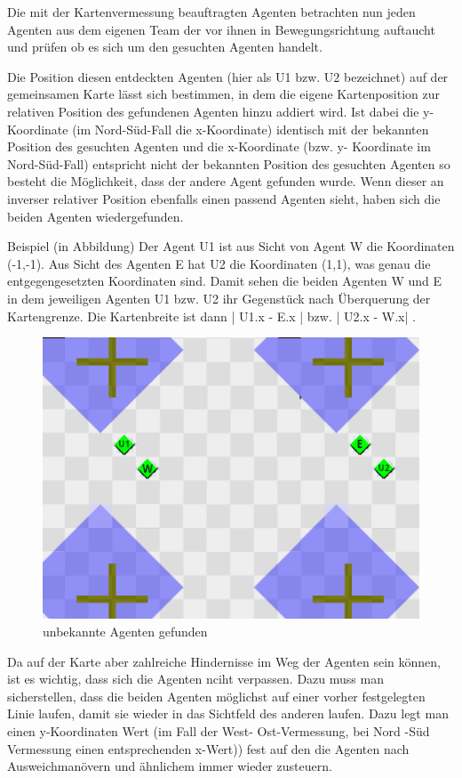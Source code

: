 \documentclass[runningheads]{llncs}
\begin{document}
Die mit der Kartenvermessung beauftragten Agenten betrachten nun jeden Agenten aus dem eigenen Team der vor ihnen in Bewegungsrichtung auftaucht und prüfen ob es sich um den gesuchten Agenten handelt.

Die Position diesen entdeckten Agenten (hier als U1 bzw. U2 bezeichnet) auf der gemeinsamen Karte lässt sich bestimmen, in dem die eigene Kartenposition zur relativen Position des gefundenen Agenten hinzu addiert wird. Ist dabei die y-Koordinate (im Nord-Süd-Fall die x-Koordinate) identisch mit der bekannten Position des gesuchten Agenten und die x-Koordinate (bzw. y- Koordinate im Nord-Süd-Fall) entspricht nicht der bekannten Position des gesuchten Agenten so besteht die Möglichkeit, dass der andere Agent gefunden wurde. Wenn dieser an inverser relativer Position ebenfalls einen passend Agenten sieht, haben sich die beiden Agenten wiedergefunden.

Beispiel (in Abbildung) 
Der Agent U1 ist aus Sicht von Agent W die Koordinaten (-1,-1). Aus Sicht des Agenten E hat U2 die Koordinaten (1,1), was genau die entgegengesetzten Koordinaten sind. Damit sehen die beiden Agenten W und E in dem jeweiligen Agenten U1 bzw. U2 ihr Gegenstück nach Überquerung der Kartengrenze. Die Kartenbreite ist dann | U1.x - E.x | bzw. | U2.x - W.x| .

\begin{figure}
\centering
\includegraphics[scale=0.5]{./Referenzen/Measurement_Step2.png}
\caption{unbekannte Agenten gefunden}
\label{measurement2}
\end{figure}


Da auf der Karte aber zahlreiche Hindernisse im Weg der Agenten sein können, ist es wichtig, dass sich die Agenten nciht verpassen. Dazu muss man sicherstellen, dass die beiden Agenten möglichst auf einer vorher festgelegten Linie laufen, damit sie wieder in das Sichtfeld des anderen laufen. Dazu legt man einen y-Koordinaten Wert (im Fall der West- Ost-Vermessung, bei Nord -Süd Vermessung einen entsprechenden x-Wert)) fest auf den die Agenten nach Ausweichmanövern und ähnlichem immer wieder zusteuern.
\end{document}
